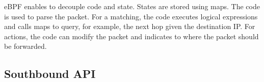 eBPF enables to decouple code and state.
States are stored using maps.
The code is used to parse the packet.
For a matching, the code executes logical expressions and calls maps to query, for example, the next hop given the destination IP.
For actions, the code can modify the packet and indicates to where the packet should be forwarded.



\subsection{Southbound API}
\label{sec:southboundAPI}

